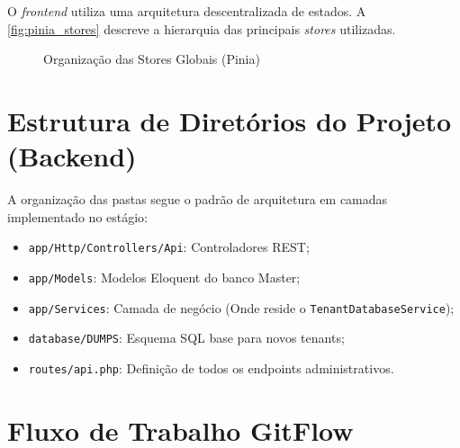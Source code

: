 O \textit{frontend} utiliza uma arquitetura descentralizada de estados. A \autoref{fig:pinia_stores} descreve a hierarquia das principais \textit{stores} utilizadas.

\begin{figure}[htb]
    \caption{\label{fig:pinia_stores}Organização das Stores Globais (Pinia)}
    \centering
\end{figure}

\section{Estrutura de Diretórios do Projeto (Backend)}

A organização das pastas segue o padrão de arquitetura em camadas implementado no estágio:

\begin{itemize}
    \item \texttt{app/Http/Controllers/Api}: Controladores REST;
    \item \texttt{app/Models}: Modelos Eloquent do banco Master;
    \item \texttt{app/Services}: Camada de negócio (Onde reside o \texttt{TenantDatabaseService});
    \item \texttt{database/DUMPS}: Esquema SQL base para novos tenants;
    \item \texttt{routes/api.php}: Definição de todos os endpoints administrativos.
\end{itemize}

\section{Fluxo de Trabalho GitFlow}

